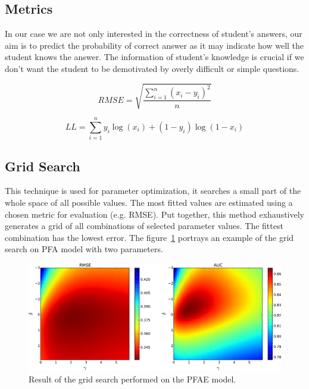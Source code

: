 \subsection{Metrics}

In our case we are not only interested in the correctness of student's answers, our aim is to predict the probability of correct answer as it may indicate how well the student knows the answer. The information of student's knowledge is crucial if we don't want the student to be demotivated by overly difficult or simple questions.

\begin{equation} \label{rmse}
  RMSE = \sqrt{\frac{\sum_{i=1}^n (x_i - y_i)^2}{n}}
\end{equation}

\begin{equation} \label{ll}
  LL = \sum_{i=1}^n y_i \log(x_i) + (1 - y_i) \log(1 - x_i)
\end{equation}

\subsection{Grid Search}

This technique is used for parameter optimization, it searches a small part of the whole space of all possible values. The most fitted values are estimated using a chosen metric for evaluation (e.g. RMSE). Put together, this method exhaustively generates a grid of all combinations of selected parameter values. The fittest combination has the lowest error. The figure~\ref{fig-grid-search-rmse-auc} portrays an example of the grid search on PFA model with two parameters.

\begin{figure}[htbp]
  \centering
  \includegraphics[width=\textwidth]{img/pfa-grid-search-rmse-auc}
  \caption{Result of the grid search performed on the PFAE model.}
  \label{fig-grid-search-rmse-auc}
\end{figure}

